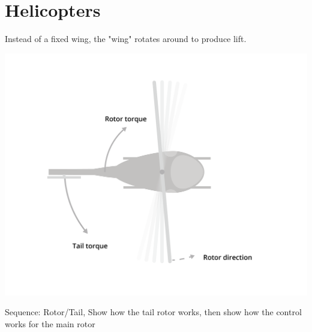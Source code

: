 \chapter{Helicopters}


Instead of a fixed wing, the "wing" rotates around to produce lift.

\includegraphics[width=.75\textwidth]{torque.png}


Sequence: Rotor/Tail, Show how the tail rotor works, then show how the control works for the main rotor